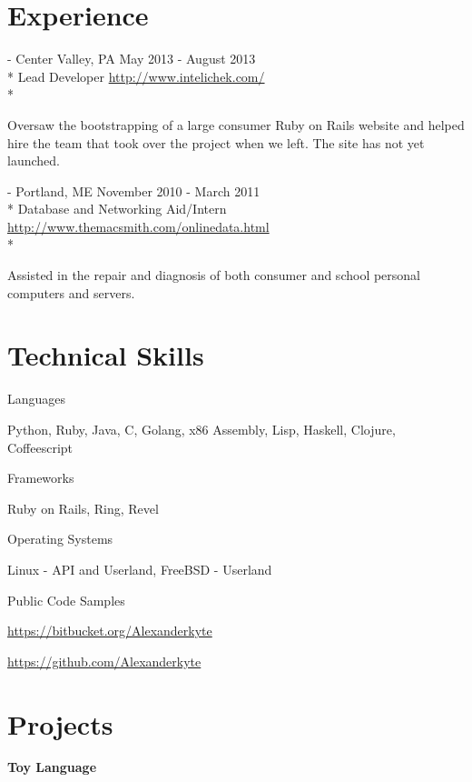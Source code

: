 \documentclass[letter,margin,line]{resume}
\newcommand{\rurl}[1]{\hfill {\footnotesize \url{#1}}}
\newcommand{\rdate}[1]{\hfill {\small #1}}
\renewcommand{\employer}[5]{\item[#1] - #2 \rdate{#3} \\* #4 \rurl{#5} \\*}
\begin{document}
\begin{resume}
\section{\mysidestyle Experience}
	\begin{asparadesc}
		\employer{Intelichek}{Center Valley, PA}{May 2013 - August 2013}{Lead Developer}{http://www.intelichek.com/}
		\item\small Oversaw the bootstrapping of a large consumer Ruby on Rails website and helped hire the team that took over the project when we left. The site has not yet launched.
		\normalsize
		\\	
	\end{asparadesc}
	\begin{asparadesc}
		\employer{MacSmith}{Portland, ME}{November 2010 - March 2011}{Database and Networking Aid/Intern}{http://www.themacsmith.com/onlinedata.html}
		\item\small Assisted in the repair and diagnosis of both consumer and school personal computers and servers.
		\normalsize
		\\	
	\end{asparadesc}

\section{\mysidestyle Technical Skills}
	\begin{compactdesc}
		\item[Languages]
			\small\item Python, Ruby, Java, C, Golang, x86 Assembly, Lisp, Haskell, Clojure, Coffeescript
		\item[Frameworks]
			\small\item Ruby on Rails, Ring, Revel
		\item[Operating Systems]
			\small\item Linux - API and Userland, FreeBSD - Userland
		\item[Public Code Samples]
			\small\item\href{https://bitbucket.org/Alexanderkyte}{https://bitbucket.org/Alexanderkyte} \hfill\small\item\href{https://github.com/alexanderkyte}{https://github.com/Alexanderkyte} \hfill
	\end{compactdesc}
	
	
\section{\mysidestyle Projects}
	\begin{asparablank}
		\item {\bf Toy Language}
		

\end{asparablank}
\end{resume}
\end{document}
